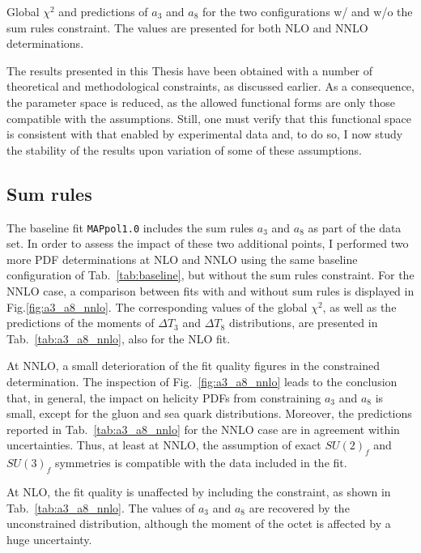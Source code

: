 \begin{table}[t!]
  \centering
  \small
  
  \caption{
    \small
    Global $\chi^2$ and predictions of $a_3$ and $a_8$ for the two configurations w/ and w/o the sum rules constraint. The values are presented for both NLO and NNLO determinations.
  \label{tab:a3_a8_nnlo}}
\end{table}

The results presented in this Thesis have been obtained with a number of theoretical and methodological constraints, as discussed earlier. As a consequence, the parameter space is reduced, as the allowed functional forms are only those compatible with the assumptions. Still, one must verify that this functional space is consistent with that enabled by experimental data and, to do so, I now study the stability of the results upon variation of some of these assumptions.

\subsection*{Sum rules}
The baseline fit \texttt{MAPpol1.0} includes the sum rules $a_3$ and $a_8$ as part of the data set. In order to assess the impact of these two additional points, I performed two more PDF determinations at NLO and NNLO using the same baseline configuration of Tab.~\ref{tab:baseline}, but without the sum rules constraint. For the NNLO case, a comparison between fits with and without sum rules is displayed in Fig.\ref{fig:a3_a8_nnlo}. The corresponding values of the global $\chi^2$, as well as the predictions of the moments of $\Delta T_3$ and $\Delta T_8$ distributions, are presented in Tab.~\ref{tab:a3_a8_nnlo}, also for the NLO fit.%

At NNLO, a small deterioration of the fit quality figures in the constrained determination. The inspection of Fig.~\ref{fig:a3_a8_nnlo} leads to the conclusion that, in general, the impact on helicity PDFs from constraining $a_3$ and $a_8$ is small, except for the gluon and sea quark distributions. Moreover, the predictions reported in Tab.~\ref{tab:a3_a8_nnlo} for the NNLO case are in agreement within uncertainties. Thus, at least at NNLO, the assumption of exact $SU(2)_f$ and $SU(3)_f$ symmetries is compatible with the data included in the fit.%

At NLO, the fit quality is unaffected by including the constraint, as shown in Tab.~\ref{tab:a3_a8_nnlo}. The values of $a_3$ and $a_8$ are recovered by the unconstrained distribution, although the moment of the octet is affected by a huge uncertainty.%

